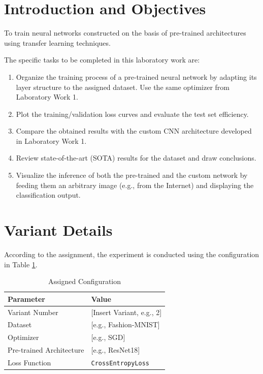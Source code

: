 \documentclass[12pt, a4paper]{article}
\begin{document}
\tableofcontents
\newpage


\section{Introduction and Objectives}

\begin{tcolorbox}[title=Laboratory Goal]
To train neural networks constructed on the basis of pre-trained architectures using transfer learning techniques.
\end{tcolorbox}

The specific tasks to be completed in this laboratory work are:
\begin{enumerate}
    \item Organize the training process of a pre-trained neural network by adapting its layer structure to the assigned dataset. Use the same optimizer from Laboratory Work 1.
    \item Plot the training/validation loss curves and evaluate the test set efficiency.
    \item Compare the obtained results with the custom CNN architecture developed in Laboratory Work 1.
    \item Review state-of-the-art (SOTA) results for the dataset and draw conclusions.
    \item Visualize the inference of both the pre-trained and the custom network by feeding them an arbitrary image (e.g., from the Internet) and displaying the classification output.
\end{enumerate}

\section{Variant Details}

According to the assignment, the experiment is conducted using the configuration in Table \ref{tab:variant}.

\begin{table}[htpb]
    \centering
    \caption{Assigned Configuration}
    \label{tab:variant}
    \begin{tabular}{ll}
        \toprule
        \textbf{Parameter} & \textbf{Value} \\
        \midrule
        Variant Number & [Insert Variant, e.g., 2] \\
        Dataset & [e.g., Fashion-MNIST] \\
        Optimizer & [e.g., SGD] \\
        Pre-trained Architecture & [e.g., ResNet18] \\
        Loss Function & \texttt{CrossEntropyLoss} \\
        \bottomrule
    \end{tabular}
\end{table}
\end{document}
